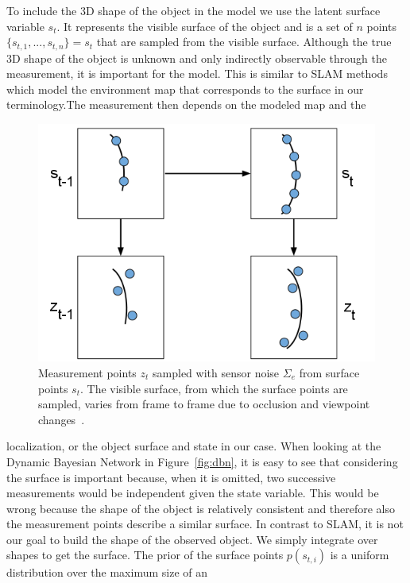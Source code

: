 \documentclass[twoside,a4paper,article]{combine}
\begin{document}
To include the 3D shape of the object in the model we use the latent
surface variable $s_t$. It represents the visible surface of the
object and is a set of $n$ points $\{s_{t,1}, ..., s_{t,n}\} = s_t$
that are sampled from the visible surface. Although the true 3D shape
of the object is unknown and only indirectly observable through the
measurement, it is important for the model. This is similar to SLAM
methods which model the environment map that corresponds to the surface in our
terminology.The measurement then depends on the modeled map and the
\begin{figure}
  \center
  \includegraphics[width=\linewidth]{surface-measurement}
  \caption{Measurement points $z_t$ sampled with sensor noise
    $\Sigma_e$ from surface points $s_t$. The visible surface, from which the
    surface points are sampled, varies from frame to frame due to
    occlusion and viewpoint changes~\cite{paper}.}
  \label{fig:surface-measurement}
\end{figure}
localization, or the object surface and state in our case. When
looking at the Dynamic Bayesian Network in Figure~\ref{fig:dbn}, it is
easy to see that considering the surface is important because, when it
is omitted, two successive measurements would be independent given the
state variable. This would be wrong because the shape of the object is
relatively consistent and therefore also the measurement points
describe a similar surface. In contrast to SLAM, it is not our goal to
build the shape of the observed object. We simply integrate over
shapes to get the surface. The prior of the surface points
$p(s_{t,i})$ is a uniform distribution over the maximum size of an
\end{document}
